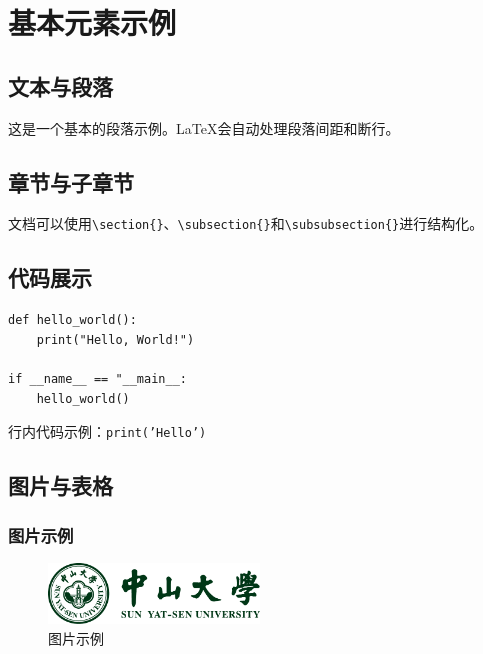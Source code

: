 \documentclass[12pt]{ctexart}
\begin{document}
\begin{sloppypar}
\renewcommand{\contentsname}{目录}
\thispagestyle{empty}
\tableofcontents
\newpage
{} 
\hypersetup{linkcolor=red}

\section{基本元素示例}

\subsection{文本与段落}
这是一个基本的段落示例。LaTeX会自动处理段落间距和断行。

\subsection{章节与子章节}
文档可以使用\verb|\section{}|、\verb|\subsection{}|和\verb|\subsubsection{}|进行结构化。

\subsection{代码展示}
\begin{verbatim}
def hello_world():
    print("Hello, World!")
    
if __name__ == "__main__:
    hello_world()
\end{verbatim}

行内代码示例：\texttt{print('Hello')}

\subsection{图片与表格}
\subsubsection{图片示例}
\begin{figure}[h!]
    \centering
    \includegraphics[width=0.5\textwidth]{figure/badge-horizonal.pdf}
    \caption{图片示例}
    \label{fig:example}
\end{figure}


\end{sloppypar}
\end{document}

